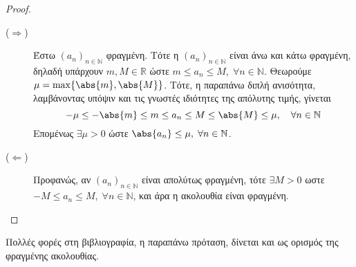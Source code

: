 \documentclass[main.tex]{subfiles}
\begin{document}

\begin{proof}
\item {}
  \begin{description}
    \item [($ \Rightarrow $)] Έστω $ (a_{n})_{n \in \mathbb{N}} $ φραγμένη. Τότε η 
      $ (a_{n})_{n \in \mathbb{N}} $ είναι άνω και κάτω φραγμένη, δηλαδή υπάρχουν 
      $ m,M \in \mathbb{R} $ ώστε $ m \leq a_{n} \leq M, \; \forall n \in \mathbb{N} $.
      Θεωρούμε $ \mu = \max \{ \abs{m} , \abs{M} \} $. Τότε, η παραπάνω διπλή 
      ανισότητα, λαμβάνοντας υπόψιν και τις γνωστές ιδιότητες της απόλυτης τιμής, 
      γίνεται
      \[
        - \mu \leq - \abs{m} \leq m \leq a_{n} \leq M \leq \abs{M} \leq \mu , 
        \quad \forall n \in \mathbb{N}
      \]
      Επομένως $ \exists \mu > 0 $ ώστε 
      $ \abs{a_{n}} \leq \mu, \; \forall n \in \mathbb{N} $.
    \item [($ \Leftarrow$)] Προφανώς, αν $( a_{n})_{n \in \mathbb{N}} $ είναι 
      απολύτως φραγμένη, τότε $ \exists M>0 $ ωστε $ -M \leq a_{n} \leq M, \; \forall n
      \in \mathbb{N} $, και άρα η ακολουθία είναι φραγμένη. \qedhere
  \end{description}
\end{proof}

\begin{rem}
  Πολλές φορές στη βιβλιογραφία, η παραπάνω πρόταση, δίνεται και ως ορισμός της 
  φραγμένης ακολουθίας.
\end{rem}
\end{document}
